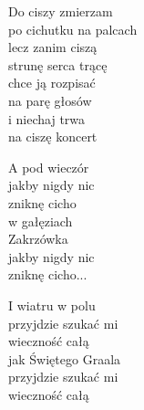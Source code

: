 \begin{text}
    Do ciszy zmierzam\\
    po cichutku na palcach\\
    lecz zanim ciszą\\
    strunę serca trącę\\
    chce ją rozpisać\\
    na parę głosów\\
    i niechaj trwa\\
    na ciszę koncert

    A pod wieczór\\
    jakby nigdy nic\\
    zniknę cicho\\
    w gałęziach\\
    Zakrzówka\\
    jakby nigdy nic\\
    zniknę cicho...

    I wiatru w polu\\
    przyjdzie szukać mi\\
    wieczność całą\\
    jak Świętego Graala\\
    przyjdzie szukać mi\\
    wieczność całą
\end{text}
\begin{chord}

\end{chord}
